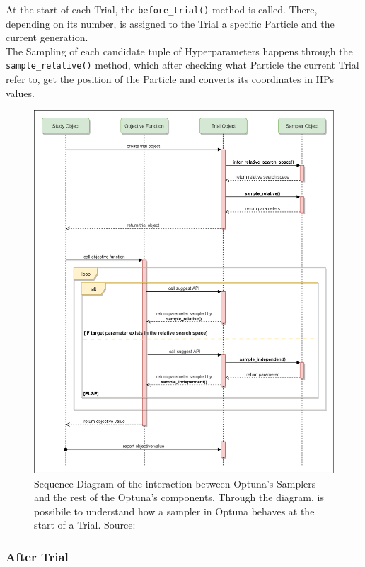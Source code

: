 At the start of each Trial, the \texttt{before\_trial()} method is called. There, depending on its number, is assigned to the Trial a specific Particle and the current generation.
\\[0.3cm]The Sampling of each candidate tuple of Hyperparameters happens through the \newline\texttt{sample\_relative()} method, which after checking what Particle the current Trial refer to, get the position of the Particle and converts its coordinates in HPs values.
\begin{figure}[H]
	\centering
	\includegraphics[width=15cm]{figures/figure-3.3.2.png}
	\caption[Sequence Diagram of Optuna's Samplers]{Sequence Diagram of the interaction between Optuna's Samplers and the rest of the Optuna's components. Through the diagram, is possibile to understand how a sampler in Optuna behaves at the start of a Trial. Source: \cite{Optuna}}
	\label{fig:figure-3.3.2}
\end{figure}

\subsubsection{After Trial}

